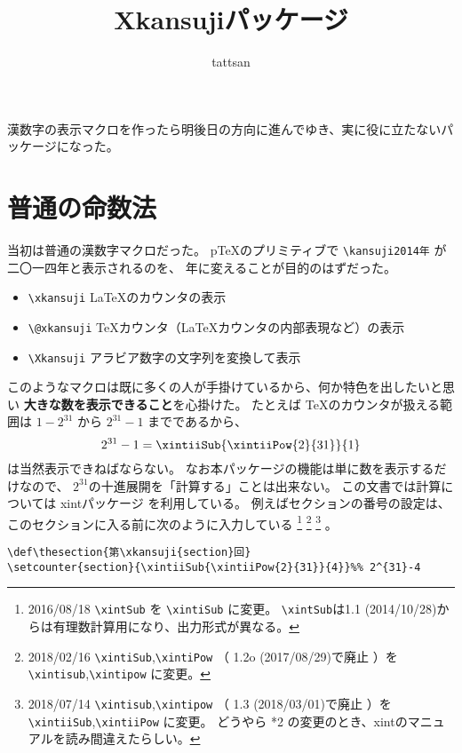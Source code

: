 \documentclass[dvipdfmx]{jsarticle}
\title{\textsf{Xkansujiパッケージ}}
\author{tattsan}
\date{}
\begin{document}
\maketitle
漢数字の表示マクロを作ったら明後日の方向に進んでゆき、実に役に立たないパッケージになった。
\def\thesection{第\xkansuji{section}話}
\section{普通の命数法}
当初は普通の漢数字マクロだった。
p\TeX\space のプリミティブで \verb+\kansuji2014年+ が二〇一四年と表示されるのを、
年に変えることが目的のはずだった。
\begin{screen}
\begin{itemize}
\item \verb+\xkansuji+ \LaTeX のカウンタの表示
\item \verb+\@xkansuji+ \TeX カウンタ（\LaTeX カウンタの内部表現など）の表示
\item \verb+\Xkansuji+ アラビア数字の文字列を変換して表示
\end{itemize}  
\end{screen}
このようなマクロは既に多くの人が手掛けているから、何か特色を出したいと思い
\textbf{大きな数を表示できること}を心掛けた。
たとえば \TeX のカウンタが扱える範囲は $1-2^{31}$ から $2^{31}-1$ までであるから、
\[
2^{31}-1=\xintiiSub{\xintiiPow{2}{31}}{1}
\]
は当然表示できねばならない。
なお本パッケージの機能は単に数を表示するだけなので、
$2^{31}$の十進展開を「計算する」ことは出来ない。
この文書では計算については \textsf{xintパッケージ} を利用している。
例えばセクションの番号の設定は、このセクションに入る前に次のように入力している
\footnote{%
2016/08/18 \texttt{\textbackslash xintSub} を \texttt{\textbackslash xintiSub} に変更。
\texttt{\textbackslash xintSub}は1.1 (2014/10/28)からは有理数計算用になり、出力形式が異なる。}%
\footnote{%
  2018/02/16 \texttt{\textbackslash xintiSub},\texttt{\textbackslash xintiPow}
  （ 1.2o (2017/08/29)で廃止 ）を\texttt{\textbackslash xintisub},\texttt{\textbackslash xintipow} に変更。}%
\footnote{%
  2018/07/14 \texttt{\textbackslash xintisub},\texttt{\textbackslash xintipow}
  （ 1.3 (2018/03/01)で廃止 ）を\texttt{\textbackslash xintiiSub},\texttt{\textbackslash xintiiPow} に変更。
  どうやら *2 の変更のとき、\textsf{xint}のマニュアルを読み間違えたらしい。}%
。
\begin{verbatim}
\def\thesection{第\xkansuji{section}回}
\setcounter{section}{\xintiiSub{\xintiiPow{2}{31}}{4}}%% 2^{31}-4
\end{verbatim}
\vspace*{-2ex}
\end{document}
